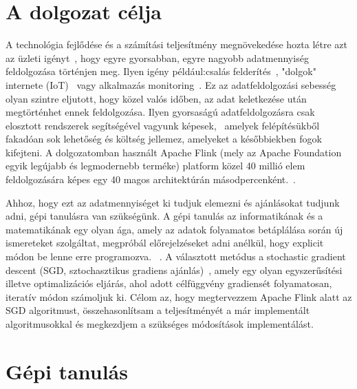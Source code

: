 \documentclass[a4paper,12pt]{article}
\begin{document}
\section{A dolgozat célja}

A technológia fejlődése és a számítási teljesítmény megnövekedése hozta létre azt az üzleti igényt~\cite{rta}, hogy egyre gyorsabban, egyre nagyobb adatmennyiség feldolgozása történjen meg. Ilyen igény például:csalás felderítés~\cite{fraud}, "dolgok" internete (IoT)~\cite{iot} vagy alkalmazás monitoring~\cite{ganalitycs}. Ez az adatfeldolgozási sebesség olyan szintre eljutott, hogy közel valós időben, az adat keletkezése után megtörténhet ennek feldolgozása. Ilyen gyorsaságú adatfeldolgozásra csak elosztott rendszerek segítségével vagyunk képesek,~\cite{ucl} amelyek felépítésükből fakadóan sok lehetőség és költség jellemez, amelyeket a későbbiekben fogok kifejteni. A dolgozatomban használt Apache Flink (mely az Apache Foundation egyik legújabb és legmodernebb terméke) platform közel 40 millió elem feldolgozására képes egy 40 magos architektúrán másodpercenként.~\cite{flink}.  \linebreak

Ahhoz, hogy ezt az adatmennyiséget ki tudjuk elemezni és ajánlásokat tudjunk adni, gépi tanulásra van szükségünk. A gépi tanulás az informatikának és a matematikának egy olyan ága, amely az adatok folyamatos betáplálása során új ismereteket szolgáltat, megpróbál előrejelzéseket adni anélkül, hogy explicit módon be lenne erre programozva. ~\cite{ml}. A választott metódus a stochastic gradient descent (SGD, sztochasztikus gradiens ajánlás)~\cite{sgd}, amely egy olyan egyszerűsítési illetve optimalizációs eljárás, ahol adott célfüggvény gradiensét folyamatosan, iteratív módon számoljuk ki. Célom az, hogy megtervezzem Apache Flink alatt az SGD algoritmust, összehasonlítsam a teljesítményét a már implementált algoritmusokkal és megkezdjem a szükséges módosítások implementálást.

\section{Gépi tanulás}
\end{document}
